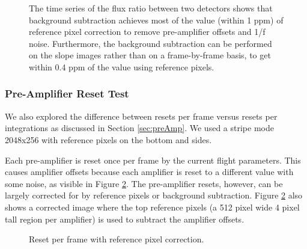 \documentclass{aastex62}
\begin{document}
\begin{figure}
{}
{}
{}
\caption{The time series of the flux ratio between two detectors shows that background subtraction achieves most of the value (within 1 ppm) of reference pixel correction to remove pre-amplifier offsets and 1/f noise.
Furthermore, the background subtraction can be performed on the slope images rather than on a frame-by-frame basis, to get within 0.4 ppm of the value using reference pixels.
}\label{fig:BackgVsRefpix}
\end{figure}

\clearpage
\subsubsection{Pre-Amplifier Reset Test}
We also explored the difference between resets per frame versus resets per integrations as discussed in Section \ref{sec:preAmp}.
We used a stripe mode 2048x256 with reference pixels on the bottom and sides.

Each pre-amplifier is reset once per frame by the current flight parameters.
This causes amplifier offsets because each amplifier is reset to a different value with some noise, as visible in Figure \ref{fig:RPFrefpix}.
The pre-amplifier resets, however, can be largely corrected for by reference pixels or background subtraction.
Figure \ref{fig:RPFrefpix} also shows a corrected image where the top reference pixels (a 512 pixel wide 4 pixel tall region per amplifier) is used to subtract the amplifier offsets.

\begin{figure}
{}
{}
\caption{Reset per frame with reference pixel correction.}\label{fig:RPFrefpix}
\end{figure}
\end{document}
